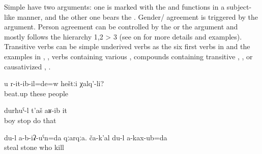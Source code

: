 Simple  have two arguments: one is marked with the  and functions in a subject-like manner, and the other one bears the . Gender/ agreement is triggered by the  argument. Person agreement can be controlled by the  or the  argument and mostly follows the hierarchy 1,2 > 3 (see  on  for more details and examples). Transitive verbs can be simple underived verbs as the six first verbs in  and the examples in , , verbs containing various , compounds containing transitive  , , or causativized  , . 
%
\begin{exe}
	\ex	\label{ex:transitive verbs}
	\begin{xlist}
		\ex	{} 
		\ex	{} 
		\ex	{} 
		\ex	{}	
		\ex	{} 
		\ex	{} 
		\ex	{} 
		\ex	{} 
		\ex	{} 	
		\ex	{} 
		\ex	{} 
	\end{xlist}

	\ex	\label{ex:Did these people beat you up}
	\gll	u	r-it-ib-il=de=w	heštːi	χalq'-li?\\
			beat.up	these	people\\
	\glt	{}

	\ex	\label{ex:The boy stopped him}
	\gll	durħuˁ-l	t'aš	aʁ-ib	it\\
		boy	stop	do	that\\
	\glt	{}

	\ex	\label{ex:‎‎I did not steal the stone. I did not kill anyone}
	\gll	du-l	a-b-iʡ-uˁn=da	qːarqːa.	ča-k'al	du-l	a-kax-ub=da\\
		 steal stone	who		kill\\
	\glt	{}
\end{exe}


